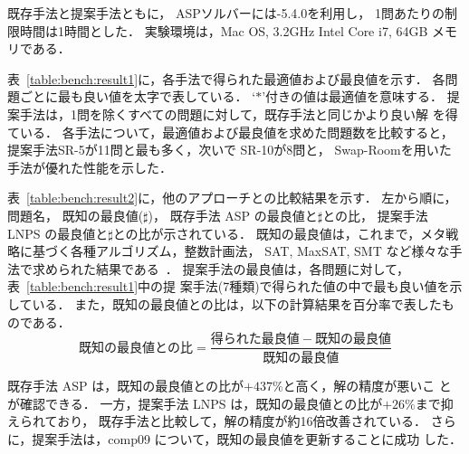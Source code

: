 既存手法と提案手法ともに，
ASPソルバーには{\clingo}-5.4.0を利用し，
1問あたりの制限時間は1時間とした．
実験環境は，Mac OS, 3.2GHz Intel Core i7, 64GB メモリである．

表~\ref{table:bench:result1}に，各手法で得られた最適値および最良値を示す．
各問題ごとに最も良い値を太字で表している．
`$\ast$'付きの値は最適値を意味する．
提案手法は，1問を除くすべての問題に対して，既存手法と同じかより良い解
を得ている．
各手法について，最適値および最良値を求めた問題数を比較すると，
提案手法\textsf{SR-5}が11問と最も多く，次いで
\textsf{SR-10}が8問と，
\textsf{Swap-Room}を用いた手法が優れた性能を示した．


表~\ref{table:bench:result2}に，他のアプローチとの比較結果を示す．
左から順に，
問題名，
既知の最良値($\sharp$)，
既存手法 ASP の最良値と$\sharp$との比，
提案手法 LNPS の最良値と$\sharp$との比が示されている．
既知の最良値は，これまで，メタ戦略に基づく各種アルゴリズム，整数計画法，
SAT, MaxSAT, SMT など様々な手法で求められた結果である~\cite{anor/Banbara2019}．
提案手法の最良値は，各問題に対して，表~\ref{table:bench:result1}中の提
案手法(7種類)で得られた値の中で最も良い値を示している．
また，既知の最良値との比は，以下の計算結果を百分率で表したものである．
\[
既知の最良値との比 = \frac{得られた最良値 - 既知の最良値}{既知の最良値}
\]

既存手法 ASP は，既知の最良値との比が$+437\%$と高く，解の精度が悪いこ
とが確認できる．
一方，提案手法 LNPS は，既知の最良値との比が$+26\%$まで抑えられており，
既存手法と比較して，解の精度が約16倍改善されている．
さらに，提案手法は，comp09 について，既知の最良値を更新することに成功
した．

